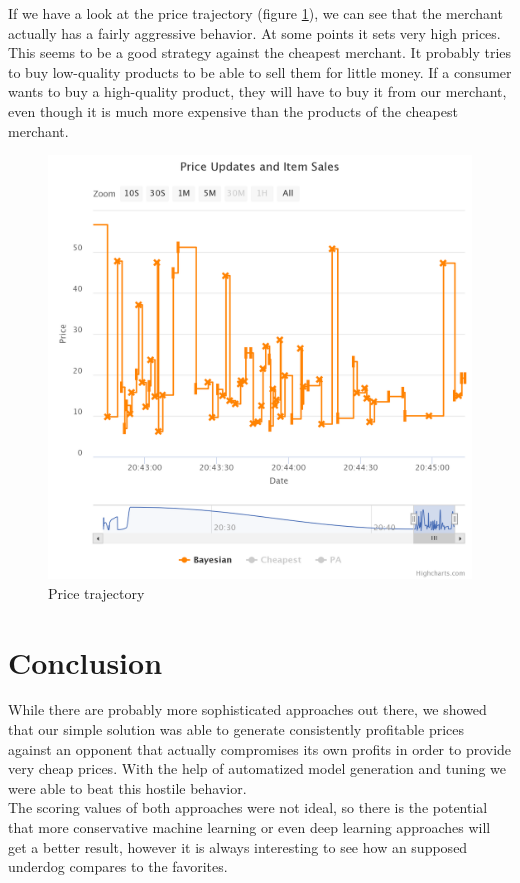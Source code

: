 \documentclass[sigconf]{acmart}
\begin{document}
If we have a look at the price trajectory (figure \ref{fig:prices}), we can see that the merchant actually has a fairly aggressive behavior. At some points it sets very high prices. This seems to be a good strategy against the cheapest merchant. It probably tries to buy low-quality products to be able to sell them for little money. If a consumer wants to buy a high-quality product, they will have to buy it from our merchant, even though it is much more expensive than the products of the cheapest merchant.

\begin{figure}
  \includegraphics[width=\columnwidth]{pictures/prices.png}
  \caption{Price trajectory}
  \label{fig:prices}
\end{figure}

\section*{Conclusion}
While there are probably more sophisticated approaches out there, we showed that our simple solution was able to generate consistently profitable prices against an opponent that actually compromises its own profits in order to provide very cheap prices. With the help of automatized model generation and tuning we were able to beat this hostile behavior.\\
The scoring values of both approaches were not ideal, so there is the potential that more conservative machine learning or even deep learning approaches will get a better result, however it is always interesting to see how an supposed underdog compares to the favorites.
\end{document}
